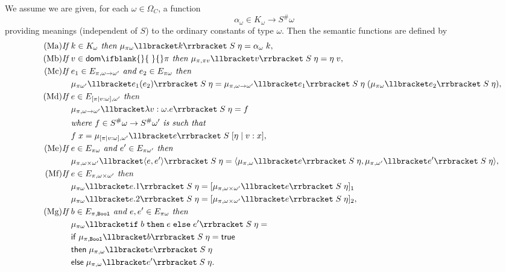\documentclass[sigplan,screen,nonacm,balance=false]{acmart}
\theoremstyle{plain}
\DeclarePairedDelimiter{\pair}{\langle}{\rangle}
\DeclarePairedDelimiter{\interp}{\llbracket}{\rrbracket}
\newcommand{\Bool}{\mathtt{Bool}}
\newcommand{\ifte}[3]{\mathtt{if} \; #1 \; \mathtt{then} \; #2 \; \mathtt{else} \; #3}
\newcommand{\dom}[1]{\mathsf{dom}\ifblank{#1}{\;}{#1}}
\newcommand{\true}{\mathsf{true}}
\newcommand{\ifm}{\mathsf{if}}
\newcommand{\thenm}{\mathsf{then}}
\newcommand{\elsem}{\mathsf{else}}
\begin{document}
We assume we are given, for each $\omega \in \Omega_{C}$, a function
%
\begin{equation*}
  \alpha_\omega \in K_\omega \to S^\# \omega
\end{equation*}
%
providing meanings (independent of $S$) to the ordinary constants of type $\omega$.
Then the semantic functions are defined by
%
\begin{align}
  \tag{Ma}
  \textit{If } & k \in K_\omega \textit{ then } \mu_{\pi \omega} \interp{k} \; S \; \eta = \alpha_\omega \; k, \\
  \tag{Mb}
  \textit{If } & v \in \dom{} \pi \textit{ then } \mu_{\pi, \pi v} \interp{v} \; S \; \eta = \eta \; v, \\
  \tag{Mc}
  \textit{If } & e_1 \in E_{\pi, \omega \to \omega'} \textit{ and } e_2 \in E_{\pi \omega} \textit{ then } \\
  \nonumber
  & \mu_{\pi \omega'} \interp{e_1(e_2)} \; S \; \eta = \mu_{\pi, \omega \to \omega'} \interp{e_1} \; S \; \eta \; (\mu_{\pi \omega} \interp{e_2} \; S \; \eta), \\
  \tag{Md}
  \textit{If } & e \in E_{[\pi \mid v : \omega], \omega'} \textit{ then } \\
  \nonumber
  & \mu_{\pi, \omega \to \omega'} \interp{\lambda v : \omega . e} \; S \; \eta = f \\
  \nonumber
  & \textit{where } f \in S^\# \omega \to S^\# \omega' \textit{ is such that } \\
  \nonumber
  & f \; x = \mu_{[\pi \mid v : \omega], \omega'} \interp{e} \; S \; [\eta \mid v : x], \\
  \tag{Me}
  \textit{If } & e \in E_{\pi \omega} \textit{ and } e' \in E_{\pi \omega'} \textit{ then } \\
  \nonumber
  & \mu_{\pi, \omega \times \omega'} \interp{\pair{e, e'}} \; S \; \eta = \pair{\mu_{\pi, \omega} \interp{e} \; S \; \eta, \mu_{\pi, \omega'} \interp{e'} \; S \; \eta}, \\
  \tag{Mf}
  \textit{If } & e \in E_{\pi, \omega \times \omega'} \textit{ then } \\
  \nonumber
  & \mu_{\pi \omega} \interp{e.1} \; S \; \eta = [\mu_{\pi, \omega \times \omega'} \interp{e} \; S \; \eta]_1 \\
  \nonumber
  & \mu_{\pi \omega} \interp{e.2} \; S \; \eta = [\mu_{\pi, \omega \times \omega'} \interp{e} \; S \; \eta]_2, \\
  \tag{Mg}
  \textit{If } & b \in E_{\pi, \Bool} \textit{ and } e, e' \in E_{\pi \omega} \textit{ then } \\
  \nonumber
  & \mu_{\pi \omega} \interp{\ifte{b}{e}{e'}} \; S \; \eta = \\
  \nonumber
  & \ifm \; \mu_{\pi, \Bool}\interp{b} \; S \; \eta = \true \\
  \nonumber
  & \thenm \; \mu_{\pi, \omega} \interp{e} \; S \; \eta \\
  \nonumber
  & \elsem \; \mu_{\pi, \omega} \interp{e'} \; S \; \eta.
\end{align}
\end{document}
